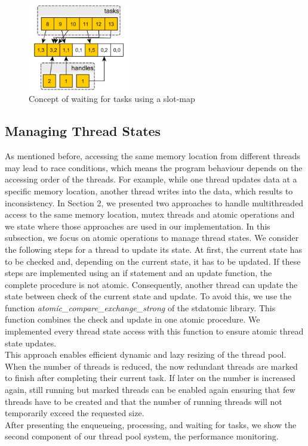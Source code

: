 \documentclass[conference]{IEEEtran}
\begin{document}
\begin{figure}
	\includegraphics[width=0.4\textwidth]{img/waitingconcept.png}
	\caption{Concept of waiting for tasks using a slot-map}
	\label{fig2}
\end{figure}

\subsection{Managing Thread States}
As mentioned before, accessing the same memory location from different threads may lead to race conditions, which means the program behaviour depends on the accessing order of the threads. For example, while one thread updates data at a specific memory location, another thread writes into the data, which results to inconsistency. In Section 2, we presented two approaches to handle multithreaded access to the same memory location, mutex threads and atomic operations and we state where those approaches are used in our implementation. In this subsection, we focus on atomic operations to manage thread states. We consider the following steps for a thread to update its state. At first, the current state has to be checked and, depending on the current state, it has to be updated. If these steps are implemented using an if statement and an update function, the complete procedure is not atomic. Consequently, another thread can update the state between check of the current state and update. To avoid this, we use the function \emph{atomic\_compare\_exchange\_strong} \cite{atomicstrong} of the stdatomic library. This function combines the check and update in one atomic procedure. We implemented every thread state access with this function to ensure atomic thread state updates. \\
 This approach enables efficient dynamic and lazy resizing of the thread pool. When the number of threads is reduced, the now redundant threads are marked to finish after completing their current task. If later on the number is increased again, still running but marked threads can be enabled again ensuring that few threads have to be created and that the number of running threads will not temporarily exceed the requested size. \\
 After presenting the enqueueing, processing, and waiting for tasks, we show the second component of our thread pool system, the performance monitoring.
\end{document}

